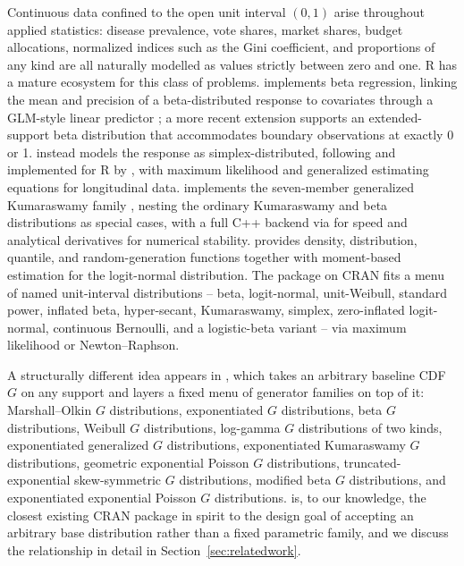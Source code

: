 Continuous data confined to the open unit interval $(0,1)$ arise
throughout applied statistics: disease prevalence, vote shares, market
shares, budget allocations, normalized indices such as the Gini
coefficient, and proportions of any kind are all naturally modelled as
values strictly between zero and one. R has a mature ecosystem for this
class of problems.  implements beta regression,
linking the mean and precision of a beta-distributed response to
covariates through a GLM-style linear predictor
\citep{cribarineto2010betareg}; a more recent extension supports an
extended-support beta distribution that accommodates boundary
observations at exactly 0 or 1.  instead models the
response as simplex-distributed, following \citet{songtan2000} and
implemented for R by \citet{zhang2016simplexreg}, with maximum
likelihood and generalized estimating equations for longitudinal data.
 implements the seven-member generalized Kumaraswamy
family \citep{carrasco2010generalized}, nesting the ordinary
Kumaraswamy and beta distributions as special cases, with a full C++
backend via  for speed and analytical derivatives
for numerical stability.  provides density,
distribution, quantile, and random-generation functions together with
moment-based estimation for the logit-normal distribution. The
 package on CRAN fits a menu of named unit-interval
distributions -- beta, logit-normal, unit-Weibull, standard power,
inflated beta, hyper-secant, Kumaraswamy, simplex, zero-inflated
logit-normal, continuous Bernoulli, and a logistic-beta variant -- via
maximum likelihood or Newton--Raphson.

A structurally different idea appears in , which
takes an arbitrary baseline CDF $G$ on any support and layers a fixed
menu of generator families on top of it: Marshall--Olkin $G$
distributions, exponentiated $G$ distributions, beta $G$ distributions,
Weibull $G$ distributions, log-gamma $G$ distributions of two kinds,
exponentiated generalized $G$ distributions, exponentiated Kumaraswamy
$G$ distributions, geometric exponential Poisson $G$ distributions,
truncated-exponential skew-symmetric $G$ distributions, modified beta
$G$ distributions, and exponentiated exponential Poisson $G$
distributions.  is, to our knowledge, the closest
existing CRAN package in spirit to the design goal of accepting an
arbitrary base distribution rather than a fixed parametric family, and
we discuss the relationship in detail in Section~\ref{sec:relatedwork}.

